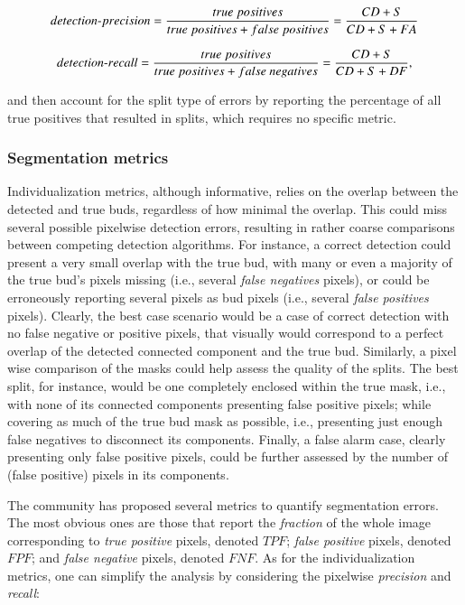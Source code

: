 \documentclass[a4paper,authoryear,review]{elsarticle}
\begin{document}
\begin{equation}
detection \mbox{-} precision = \frac{true\ positives}{true\ positives+false\ positives} \\
= \frac{CD+S}{CD+S+FA}
\label{eq:detection-precision}
\end{equation}

\begin{equation}
detection \mbox{-} recall = \frac{true\ positives}{true\ positives+false\ negatives} \\
= \frac{CD+S}{CD+S+DF},
\label{eq:detection-recall}
\end{equation}

and then account for the split type of errors by reporting  the percentage of all true positives that resulted in splits, which requires no specific metric. 

\subsubsection{Segmentation metrics} \label{subsec:segmetrics}

Individualization metrics, although informative, relies on  the overlap between the detected and true buds, regardless of how minimal the overlap. This could miss several possible pixelwise detection errors, resulting in rather coarse comparisons between competing detection algorithms. For instance, a correct detection could present a very small overlap with the true bud, with many or even a majority of the true bud’s pixels missing (i.e., several \emph{false negatives} pixels), or could be erroneously reporting several pixels as bud pixels (i.e., several \emph{false positives} pixels). Clearly, the best case scenario would be a case of correct detection with no false negative or positive pixels, that visually would correspond to a perfect overlap of the detected connected component and the true bud.  Similarly, a pixel wise comparison of the masks could help assess the quality of the splits. The best split, for instance, would be one completely enclosed within the true mask, i.e., with none of its connected components presenting false positive pixels; while covering as much of the true bud mask as possible, i.e., presenting just enough false negatives to disconnect its components. 
%
Finally, a false alarm case, clearly presenting only false positive pixels, could be further assessed by the number of (false positive) pixels in its components. 

The community has proposed several metrics to quantify segmentation errors. The most obvious ones are those that 
report the \emph{fraction} of the whole image corresponding to \emph{true positive} pixels, denoted $TPF$; \emph{false positive} pixels,  denoted $FPF$;  and \emph{false negative} pixels, denoted $FNF$. 
%
As for the individualization metrics, one can simplify the analysis by considering the  pixelwise \emph{precision}  and \emph{recall}: 
\end{document}
